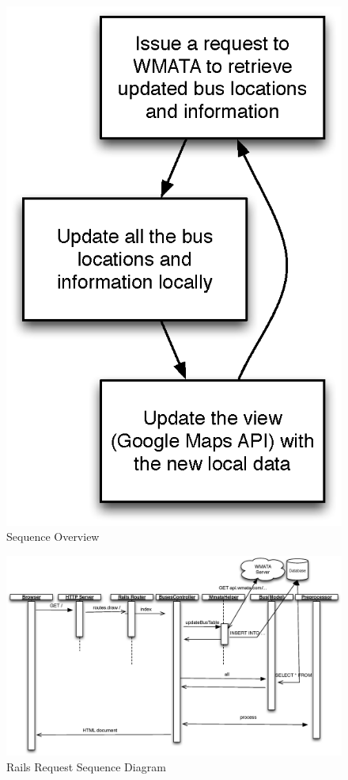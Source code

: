 \documentclass[12pt]{article}
\begin{document}
\begin{figure}[h]
  \caption{Sequence Overview}
  \centering
    \includegraphics[width=1.0\textwidth]{sequence-diagram.eps}
\end{figure}

\begin{figure}[h]
  \caption{Rails Request Sequence Diagram}
  \centering
    \includegraphics[width=1.0\textwidth]{rails-sequence.eps}
\end{figure}
\end{document}
